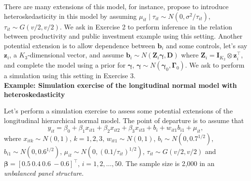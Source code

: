 There are many extensions of this model, for instance, \cite{Chib1999} propose to introduce heteroskedasticity in this model by assuming $\mu_{it}\mid \tau_{it}\sim N(0, \sigma^2/\tau_{it})$, $\tau_{it}\sim G(v/2,v/2)$. We ask in Exercise 2 to perform inference in the relation between productivity and public investment example using this setting. Another potential extension is to allow dependence between $\bm{b}_i$ and some controls, let's say $\bm{z}_i$, a $K_3$-dimensional vector, and assume $\bm{b}_i\sim N(\bm{Z}_i\bm{\gamma},\bm{D})$ where $\bm{Z}_i=\bm{I}_{K_2}\otimes \bm{z}_i^{\top}$, and complete the model using a prior for $\bm{\gamma}$, $\bm{\gamma}\sim N(\bm{\gamma}_0,\bm{\Gamma}_0)$. We ask to perform a simulation using this setting in Exercise 3.\\   

\textbf{Example: Simulation exercise of the longitudinal normal model with heteroskedasticity}

Let's perform a simulation exercise to assess some potential extensions of the longitudinal hierarchical normal model. The point of departure is to assume that
\[y_{it}=\beta_0+\beta_1x_{it1}+\beta_2x_{it2}+\beta_3x_{it3}+b_i+w_{it1}b_{i1}+\mu_{it},\]
where $x_{itk}\sim N(0,1)$, $k=1,2,3$, $w_{it1}\sim N(0,1)$, $b_i\sim N(0, 0.7^{1/2})$, $b_{i1}\sim N(0, 0.6^{1/2})$, $\mu_{it}\sim N(0, (0.1/\tau_{it})^{1/2})$, $\tau_{it}\sim G(v/2,v/2)$ and $\bm{\beta}=[0.5 \ 0.4 \ 0.6 \ -0.6]^{\top}$, $i=1,2,\dots,50$. The sample size is 2,000 in an \textit{unbalanced panel structure}. 

